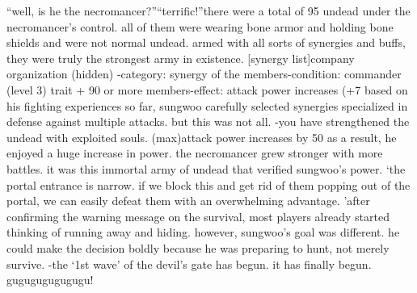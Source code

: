 “well, is he the necromancer?”“terrific!”there were a total of 95 undead under the necromancer’s control.
 all of them were wearing bone armor and holding bone shields and were not normal undead.
armed with all sorts of synergies and buffs, they were truly the strongest army in existence.
[synergy list]company organization (hidden) -category: synergy of the members-condition: commander (level 3) trait + 90 or more members-effect: attack power increases (+7%
based on his fighting experiences so far, sungwoo carefully selected synergies specialized in defense against multiple attacks.
but this was not all.
-you have strengthened the undead with exploited souls.
 (max)attack power increases by 50%
 as a result, he enjoyed a huge increase in power.
the necromancer grew stronger with more battles.
 it was this immortal army of undead that verified sungwoo’s power.
‘the portal entrance is narrow.
 if we block this and get rid of them popping out of the portal, we can easily defeat them with an overwhelming advantage.
’after confirming the warning message on the survival, most players already started thinking of running away and hiding.
however, sungwoo’s goal was different.
 he could make the decision boldly because he was preparing to hunt, not merely survive.
-the ‘1st wave’ of the devil’s gate has begun.
it has finally begun.
gugugugugugugu!

